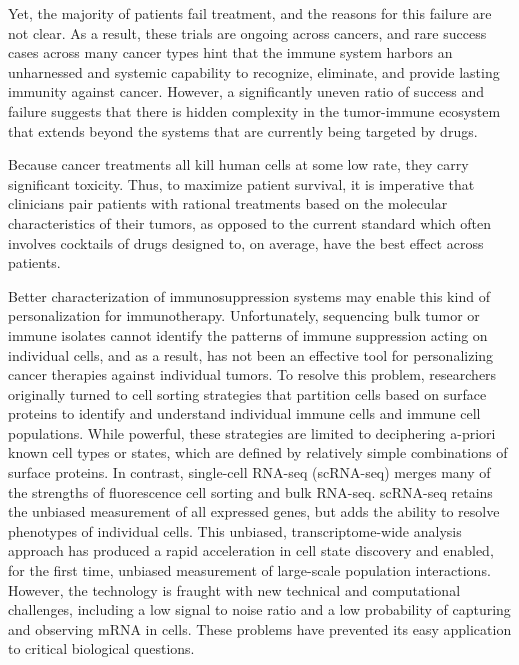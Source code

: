 Yet, the majority of patients fail treatment, and the reasons for this failure are not clear.  
As a result, these trials are ongoing across cancers, and rare success cases across many cancer types hint that the immune system harbors an unharnessed and systemic capability to recognize, eliminate, and provide lasting immunity against cancer.
However, a significantly uneven ratio of success and failure suggests that there is hidden complexity in the tumor-immune ecosystem that extends beyond the systems that are currently being targeted by drugs.

Because cancer treatments all kill human cells at some low rate, they carry significant toxicity. 
Thus, to maximize patient survival, it is imperative that clinicians pair patients with rational treatments based on the molecular characteristics of their tumors, as opposed to the current standard which often involves cocktails of drugs designed to, on average, have the best effect across patients. 

Better characterization of immunosuppression systems may enable this kind of personalization for immunotherapy. 
Unfortunately, sequencing bulk tumor or immune isolates cannot identify the patterns of immune suppression acting on individual cells, and as a result, has not been an effective tool for personalizing cancer therapies against individual tumors.  
To resolve this problem, researchers originally turned to cell sorting strategies that partition cells based on surface proteins to identify and understand individual immune cells and immune cell populations.
While powerful, these strategies are limited to deciphering a-priori known cell types or states, which are defined by relatively simple combinations of surface proteins.
In contrast, single-cell RNA-seq (scRNA-seq) merges many of the strengths of fluorescence cell sorting and bulk RNA-seq. 
scRNA-seq retains the unbiased measurement of all expressed genes, but adds the ability to resolve phenotypes of individual cells.
This unbiased, transcriptome-wide analysis approach has produced a rapid acceleration in cell state discovery and enabled, for the first time, unbiased measurement of large-scale population interactions.
However, the technology is fraught with new technical and computational challenges, including a low signal to noise ratio and a low probability of capturing and observing mRNA in cells. 
These problems have prevented its easy application to critical biological questions.

